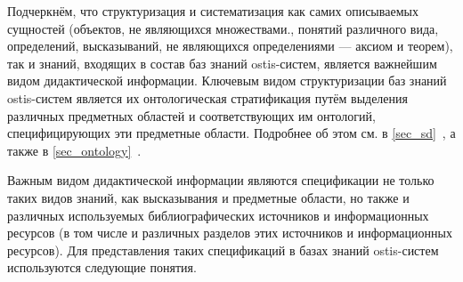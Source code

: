 Подчеркнём, что структуризация и систематизация как самих описываемых сущностей (объектов, не являющихся множествами., понятий различного вида, определений, высказываний, не являющихся определениями --- аксиом и теорем), так и знаний, входящих в состав баз знаний ostis-систем, является важнейшим видом дидактической информации. Ключевым видом структуризации баз знаний ostis-систем является их онтологическая стратификация путём выделения различных предметных областей и соответствующих им онтологий, специфицирующих эти предметные области. Подробнее об этом см. в \ref{sec_sd}~, а также в \ref{sec_ontology}~.

Важным видом дидактической информации являются спецификации не только таких видов знаний, как высказывания и предметные области, но также и различных используемых библиографических источников и информационных ресурсов (в том числе и различных разделов этих источников и информационных ресурсов). Для представления таких спецификаций в базах знаний ostis-систем используются следующие понятия.

\begin{SCn}
\end{SCn}

\begin{SCn}
\end{SCn}

\begin{SCn}
\end{SCn}

\begin{SCn}
\end{SCn}

\begin{SCn}
\end{SCn}

\begin{SCn}
\end{SCn}

\begin{SCn}
\end{SCn}

\begin{SCn}
\end{SCn}

